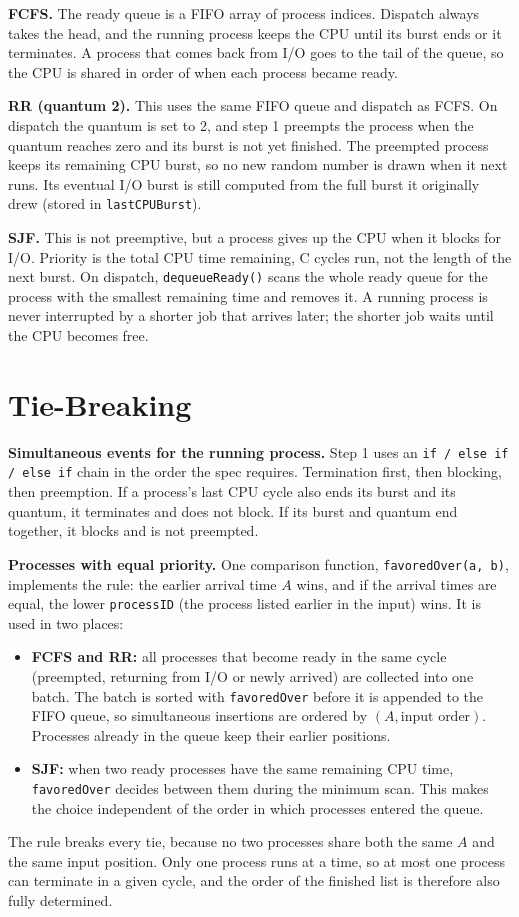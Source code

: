 \documentclass[11pt,letterpaper]{article}
\begin{document}
\textbf{FCFS.} The ready queue is a FIFO array of process indices. Dispatch always takes the head, and the running
process keeps the CPU until its burst ends or it terminates. A process that comes back from I/O
goes to the tail of the queue, so the CPU is shared in order of when each process became ready.

\textbf{RR (quantum 2).} This uses the same FIFO queue and dispatch as FCFS. On dispatch the quantum is set to 2,
and step 1 preempts the process when the quantum reaches zero and its burst is not yet finished. The preempted
process keeps its remaining CPU burst, so no new random number is drawn when it next runs. Its eventual I/O
burst is still computed from the full burst it originally drew (stored in \texttt{lastCPUBurst}).

\textbf{SJF.} This is not preemptive, but a process gives up the CPU when it blocks for I/O. Priority is the total
CPU time remaining, C  cycles run, not the length of the next burst. On dispatch,
\texttt{dequeueReady()} scans the whole ready queue for the process with the smallest remaining time and
removes it. A running process is never interrupted by a shorter job that arrives later; the shorter job waits
until the CPU becomes free.

\section{Tie-Breaking}

\textbf{Simultaneous events for the running process.} Step 1 uses an \texttt{if / else if / else if} chain in
the order the spec requires. Termination first, then blocking, then preemption. If a process's last CPU cycle
also ends its burst and its quantum, it terminates and does not block. If its burst and quantum end together,
it blocks and is not preempted.

\textbf{Processes with equal priority.} One comparison function, \texttt{favoredOver(a, b)}, implements the
rule: the earlier arrival time \(A\) wins, and if the arrival times are equal, the lower \texttt{processID} (the
process listed earlier in the input) wins. It is used in two places:
\begin{itemize}
  \item \textbf{FCFS and RR:} all processes that become ready in the same cycle (preempted, returning from I/O or
        newly arrived) are collected into one batch. The batch is sorted with \texttt{favoredOver} before it is
        appended to the FIFO queue, so simultaneous insertions are ordered by \((A, \text{input order})\).
        Processes already in the queue keep their earlier positions.
  \item \textbf{SJF:} when two ready processes have the same remaining CPU time, \texttt{favoredOver} decides
        between them during the minimum scan. This makes the choice independent of the order in which
        processes entered the queue.
\end{itemize}
The rule breaks every tie, because no two processes share both the same \(A\) and the same input position.
Only one process runs at a time, so at most one process can terminate in a given cycle, and the order of the
finished list is therefore also fully determined.
\end{document}
